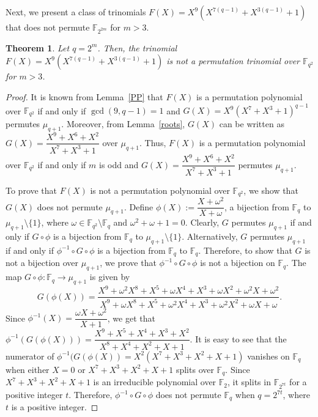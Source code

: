 \documentclass[12pt,reqno]{amsart}
\newtheorem{thm}{Theorem}[section]
\numberwithin{equation}{section}
\theoremstyle{definition}
\newcommand{\F}{\mathbb F}
\begin{document}
Next, we present a class of trinomials 
$F(X)=X^{9}( X^{7(q-1)} + X^{3(q-1)} + 1)$ that does not permute $\F_{2^{2m}}$ for $m>3$.

\begin{thm}
Let $q=2^m$. Then, the trinomial $F(X)=X^{9}( X^{7(q-1)} +X^{3(q-1)} + 1)$ is not a permutation trinomial over $\F_{q^2}$ for $m>3$.
\end{thm}

\begin{proof}
It is known from Lemma~\ref{PP} that $F(X)$ is a permutation polynomial over $\F_{q^2}$ if and only if $\gcd(9,q-1)=1$ and $G(X)=X^9(X^7+X^3+1)^{q-1}$ permutes $\mu_{q+1}$. Moreover, from Lemma~\ref{roots}, $G(X)$ can be written as $G(X)=\dfrac{X^{9}+X^{6}+X^{2}}{X^7+X^3+1}$ over $\mu_{q+1}$. Thus, $F(X)$ is a permutation polynomial over $\F_{q^2}$ if and only if $m$ is odd and $G(X)=\dfrac{X^{9}+X^{6}+X^{2}}{X^7+X^3+1}$ permutes $\mu_{q+1}$. 

To prove that $F(X)$ is not a permutation polynomial over $\F_{q^2}$, we show that $G(X)$ does not permute $\mu_{q+1}$. Define $\phi(X) :=\dfrac{X+\omega^2}{X+\omega}$, a bijection from $\F_q$ to $\mu_{q+1}\setminus \{1\}$, where $\omega \in \F_{q^2} \setminus \F_q$ and $\omega^2+\omega+1=0$. Clearly, $G$ permutes $\mu_{q+1}$ if and only if $G \circ \phi$ is a bijection from $\F_q$ to $\mu_{q+1}\setminus \{1\}$. Alternatively, $G$ permutes $\mu_{q+1}$ if and only if $\phi^{-1} \circ G \circ \phi$ is a bijection from $\F_q$ to $\F_q$. Therefore, to show that $G$ is not a bijection over $\mu_{q+1}$, we prove that $\phi^{-1} \circ G \circ \phi$ is not a bijection on $\F_q$. The map $G \circ \phi : \F_q \rightarrow \mu_{q+1}$ is given by
$$
G (\phi(X))= \dfrac{X^{9}+\omega^2 X^8+ X^5+\omega X^4+ X^3+\omega X^2+\omega^2 X+\omega^2}{X^9+\omega X^8+X^5+\omega^2X^4+X^3+\omega^2X^2+\omega X +\omega}.
$$
Since $\phi^{-1}(X)=\dfrac{\omega X+\omega^2}{X+1}$, we get that 
$
\phi^{-1}(G (\phi(X)))= \dfrac{X^9+X^5+X^4+X^3+X^2}{X^8+X^4+X^2+X+1}.
$
It is easy to see that the numerator of $\phi^{-1}(G (\phi(X))= X^2(X^7+X^3+X^2+X+1)$ vanishes on $\F_q$ when either $X=0$ or $X^7+X^3+X^2+X+1$ splits over $\F_q$. Since $X^7+X^3+X^2+X+1$ is an irreducible polynomial over $\F_2$, it splits in $\F_{2^{7t}}$ for a positive integer $t$. Therefore, $\phi^{-1} \circ G \circ \phi$ does not permute $\F_q$ when $q=2^{7t}$, where $t$ is a positive integer.


\end{proof}
\end{document}
